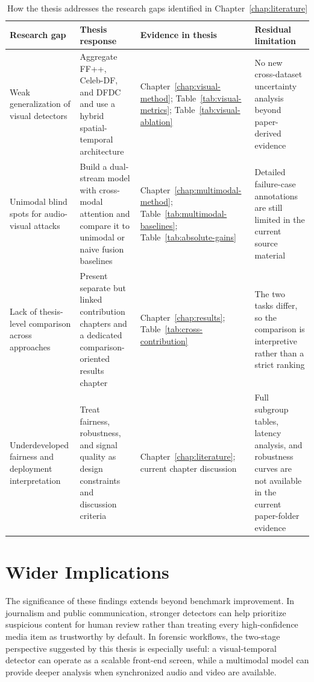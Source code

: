 \begin{table}[H]
\centering
\small
\caption{How the thesis addresses the research gaps identified in Chapter~\ref{chap:literature}}
\label{tab:gap-closure}
\begin{tabular}{p{}p{}p{}p{}}
\toprule
\textbf{Research gap} & \textbf{Thesis response} & \textbf{Evidence in thesis} & \textbf{Residual limitation} \\
\midrule
Weak generalization of visual detectors & Aggregate FF++, Celeb-DF, and DFDC and use a hybrid spatial-temporal architecture & Chapter~\ref{chap:visual-method}; Table~\ref{tab:visual-metrics}; Table~\ref{tab:visual-ablation} & No new cross-dataset uncertainty analysis beyond paper-derived evidence \\
Unimodal blind spots for audio-visual attacks & Build a dual-stream model with cross-modal attention and compare it to unimodal or naive fusion baselines & Chapter~\ref{chap:multimodal-method}; Table~\ref{tab:multimodal-baselines}; Table~\ref{tab:absolute-gains} & Detailed failure-case annotations are still limited in the current source material \\
Lack of thesis-level comparison across approaches & Present separate but linked contribution chapters and a dedicated comparison-oriented results chapter & Chapter~\ref{chap:results}; Table~\ref{tab:cross-contribution} & The two tasks differ, so the comparison is interpretive rather than a strict ranking \\
Underdeveloped fairness and deployment interpretation & Treat fairness, robustness, and signal quality as design constraints and discussion criteria & Chapter~\ref{chap:literature}; current chapter discussion & Full subgroup tables, latency analysis, and robustness curves are not available in the current paper-folder evidence \\
\bottomrule
\end{tabular}
\end{table}

\section{Wider Implications}

The significance of these findings extends beyond benchmark improvement. In journalism and public communication, stronger detectors can help prioritize suspicious content for human review rather than treating every high-confidence media item as trustworthy by default. In forensic workflows, the two-stage perspective suggested by this thesis is especially useful: a visual-temporal detector can operate as a scalable front-end screen, while a multimodal model can provide deeper analysis when synchronized audio and video are available.

